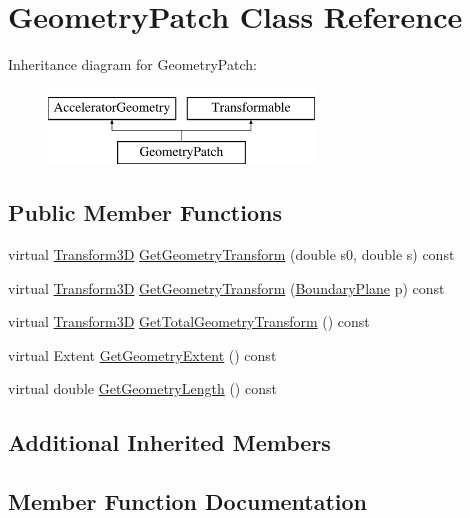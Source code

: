 \hypertarget{classGeometryPatch}{}\section{Geometry\+Patch Class Reference}
\label{classGeometryPatch}
Inheritance diagram for Geometry\+Patch\+:\begin{figure}[H]
\begin{center}
\leavevmode
\includegraphics[height=2.000000cm]{classGeometryPatch}
\end{center}
\end{figure}
\subsection*{Public Member Functions}
\begin{DoxyCompactItemize}
\item 
virtual \hyperlink{classTransform3D}{Transform3D} \hyperlink{classGeometryPatch_ae45360bf4f4a8bad9189eb34bca2a919}{Get\+Geometry\+Transform} (double s0, double s) const
\item 
virtual \hyperlink{classTransform3D}{Transform3D} \hyperlink{classGeometryPatch_a461f15c9a93cc4473463191c9d0f6465}{Get\+Geometry\+Transform} (\hyperlink{classAcceleratorGeometry_a5c1661938176102f235836f5a8be6034}{Boundary\+Plane} p) const
\item 
virtual \hyperlink{classTransform3D}{Transform3D} \hyperlink{classGeometryPatch_a94c4c26b1a43acc6a34b29d00a229d70}{Get\+Total\+Geometry\+Transform} () const
\item 
virtual Extent \hyperlink{classGeometryPatch_a814a517dd837f92d7f26628562047cb2}{Get\+Geometry\+Extent} () const
\item 
virtual double \hyperlink{classGeometryPatch_ae2d9aef3fc3df96fdf0340124f099997}{Get\+Geometry\+Length} () const
\end{DoxyCompactItemize}
\subsection*{Additional Inherited Members}


\subsection{Member Function Documentation}
\mbox{\label{classGeometryPatch_a814a517dd837f92d7f26628562047cb2}} 
